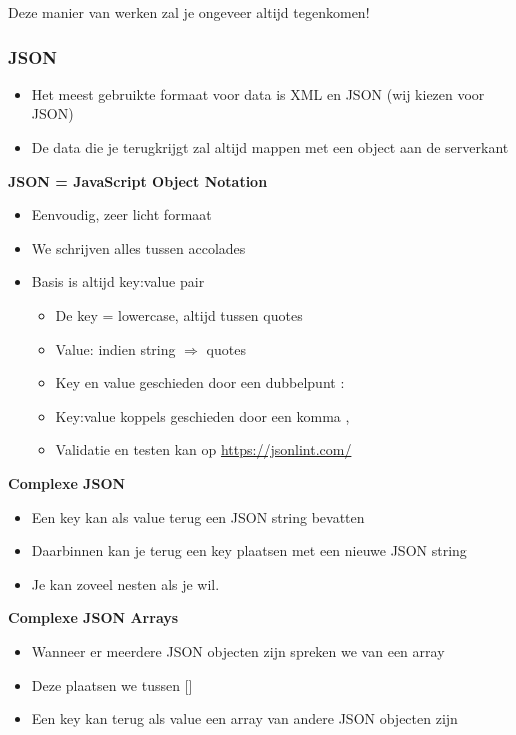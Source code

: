 \documentclass{article}
\newcommand{\bold}[1]{\textbf{#1}}
\begin{document}
Deze manier van werken zal je ongeveer altijd tegenkomen!

\subsubsection{JSON}

\begin{itemize}
    \item Het meest gebruikte formaat voor data is XML en JSON (wij kiezen voor JSON)
    \item De data die je terugkrijgt zal altijd mappen met een object aan de serverkant
\end{itemize}

\bold{JSON = JavaScript Object Notation}

\begin{itemize}
    \item Eenvoudig, zeer licht formaat
    \item We schrijven alles tussen accolades
    \item Basis is altijd key:value pair
    \begin{itemize}
        \item De key = lowercase, altijd tussen quotes
        \item Value: indien string $\Rightarrow$ quotes
        \item Key en value geschieden door een dubbelpunt :
        \item Key:value koppels geschieden door een komma ,
    \end{itemize}
    \begin{itemize}
        \item Validatie en testen kan op \url{https://jsonlint.com/}
    \end{itemize}
\end{itemize}

\bold{Complexe JSON}

\begin{itemize}
    \item Een key kan als value terug een JSON string bevatten
    \item Daarbinnen kan je terug een key plaatsen met een nieuwe JSON string
    \item Je kan zoveel nesten als je wil.
\end{itemize}

\bold{Complexe JSON Arrays}

\begin{itemize}
    \item Wanneer er meerdere JSON objecten zijn spreken we van een array
    \item Deze plaatsen we tussen []
    \item Een key kan terug als value een array van andere JSON objecten zijn
\end{itemize}
\end{document}
